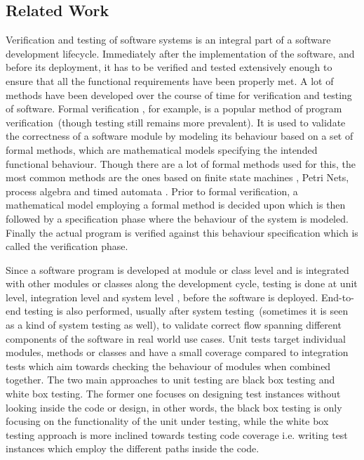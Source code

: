 \raggedbottom
\subsection{Related Work}

Verification and testing of software systems \cite{myers2011art} is an integral part of a software development lifecycle. Immediately after the implementation of the software, and before its deployment, it has to be verified and tested extensively enough to ensure that all the functional requirements have been properly met. A lot of methods have been developed over the course of time for verification and testing of software. Formal verification \cite{wang2004formal}, for example, is a popular method of program verification~(though testing still remains more prevalent). It is used to validate the correctness of a software module by modeling its behaviour based on a set of formal methods, which are mathematical models specifying the intended functional behaviour. Though there are a lot of formal methods used for this, the most common methods are the ones based on finite state machines \cite{chow1978testing}, Petri Nets, process algebra and timed automata \cite{clarke1996formal}. Prior to formal verification, a mathematical model employing a formal method is decided upon which is then followed by a specification phase where the behaviour of the system is modeled. Finally the actual program is verified against this behaviour specification which is called the verification phase.%

Since a software program is developed at module or class level and is integrated with other modules or classes along the development cycle, testing is done at unit level, integration level and system level \cite{myers2011art}, before the software is deployed. End-to-end testing \cite{tsai2001end} is also performed, usually after system testing~(sometimes it is seen as a kind of system testing as well), to validate correct flow spanning different components of the software in real world use cases. Unit tests target individual modules, methods or classes and have a small coverage compared to integration tests which aim towards checking the behaviour of modules when combined together. The two main approaches to unit testing are black box testing and white box testing. The former one focuses on designing test instances without looking inside the code or design, in other words, the black box testing
is only focusing on the functionality of the unit under testing, while the white box testing approach is more inclined towards testing code coverage i.e. writing test instances which employ the different paths inside the code.

